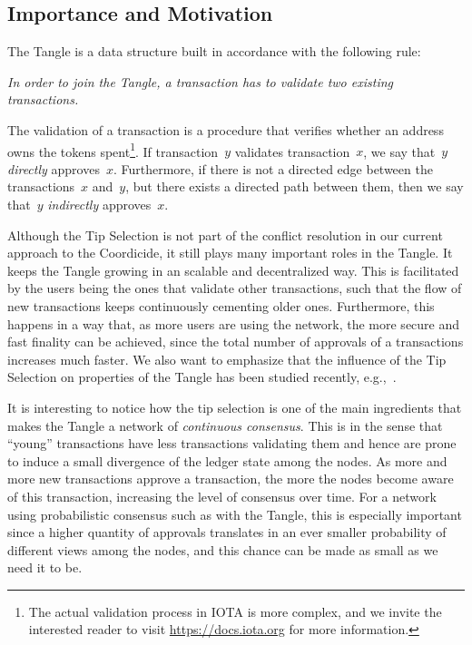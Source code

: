 \documentclass[../main.tex]{subfiles}
\begin{document}
\subsection{Importance and Motivation}

The Tangle is a data structure built in accordance with the following rule:

\begin{displayquote}
    \textit{In order to join the Tangle, a transaction has to validate two existing transactions.}
\end{displayquote}

\noindent
The validation of a transaction is a procedure that verifies whether an address owns the tokens spent\footnote{The actual validation process in IOTA is more complex, and we invite the interested reader to visit \url{https://docs.iota.org} for more information.}. If transaction~$y$ validates transaction~$x$, we say that~$y$ \textit{directly} 
approves~$x$. Furthermore, if there is not a directed edge between the transactions~$x$ and~$y$, but there exists a directed path between them, then we say that~$y$ \textit{indirectly} approves~$x$.


Although the Tip Selection is not part of the conflict resolution in our current approach to the Coordicide, it still plays many important roles in the Tangle. It keeps the Tangle growing in an scalable and decentralized way. This is facilitated by the users being the ones that validate other transactions, such that the flow of new transactions keeps continuously cementing older ones. Furthermore, this happens in a way that, as more users are using the network, the more secure and fast finality can be achieved, since the total number of approvals of a transactions increases much faster.  We also want to emphasize that the influence of the Tip Selection on properties of the Tangle has been studied recently, e.g.,~\cite{Cullenetal:19, FerKiSh:18, KuGa:18, popovSaaFinardi2017}.

It is interesting to notice how the tip selection is one of the main ingredients that makes the Tangle a network of \textit{continuous consensus}. This is in the sense that ``young'' transactions have less transactions validating them and hence are prone to induce a small divergence of the ledger state among the nodes. As more and more new transactions approve a transaction, the more the nodes become aware of this transaction, increasing the level of consensus over time. For a network using probabilistic consensus such as with the Tangle, this is especially important since a higher quantity of approvals translates in an ever smaller probability of different views among the nodes, and this chance can be made as small as we need it to be. 
\end{document}
